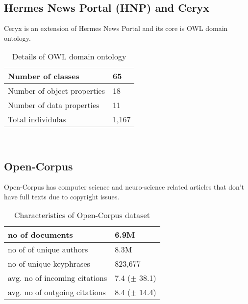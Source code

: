 \subsection{Hermes News Portal (HNP) and Ceryx}
Ceryx is an extension of Hermes News Portal  and its core is OWL domain ontology\cite{CF-IDF+}. 
\\
\begin{table}[!htbp] 
\centering
\footnotesize
\def\arraystretch{1.4}%
\centering
\begin{tabular}{|p{8cm}|p{2cm}|}
\hline
Number of classes & 65
\\
\hline 
Number of object properties & 18
\\
\hline 
Number of data properties & 11
\\
\hline 
Total individulas & 1,167
\\
\hline
\end{tabular}

\caption{Details of OWL domain ontology}
\label{table:16}
\end{table}
\\
\subsection{Open-Corpus}
Open-Corpus\cite{N1} has computer science and neuro-science related articles that don't have full texts due to copyright issues.
\\
\begin{table}[!htbp] 
\centering
\footnotesize
\def\arraystretch{1.4}%
\centering
\begin{tabular}{|p{8.1cm}|p{2.6cm}|}
\hline
no of documents & 6.9M
\\
\hline 
no of of unique authors & 8.3M
\\
\hline 
no of unique keyphrases & 823,677
\\
\hline 
avg. no of incoming citations & 7.4 ($\pm$ 38.1)
\\
\hline
avg. no of outgoing citations & 8.4 ($\pm$ 14.4)
\\
\hline
\end{tabular}
\caption{Characteristics of Open-Corpus dataset}
\label{table:23}

\end{table}
\\
